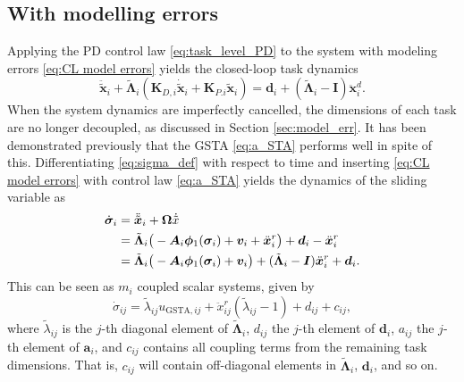 \documentclass[../main.tex]{subfiles}
\begin{document}
\subsection{With modelling errors}
\label{sec:analysis with model err}
Applying the PD control law \eqref{eq:task_level_PD} to the system with modeling errors \eqref{eq:CL model errors} yields the closed-loop task dynamics
\begin{equation}
    \label{eq:closed loop PD}
    \ddot{\tilde{\bm{x}}}_i
    +\tilde{\bm{\Lambda}}_i (
    \bm{K}_{D,i}\dot{\tilde{\bm{x}}}_i
    + \bm{K}_{P.i}\tilde{\bm{x}}_i)
    = \bm{d}_i + (\tilde{\bm{\Lambda}}_i - \bm{I})\ddot{\bm{x}}_i^d.
\end{equation}
When the system dynamics are imperfectly cancelled, the dimensions of each task are no longer decoupled, as discussed in Section \ref{sec:model_err}. It has been demonstrated previously \citep{Borlaug2022} that the GSTA \eqref{eq:a_STA} performs well in spite of this. Differentiating \eqref{eq:sigma_def} with respect to time and inserting \eqref{eq:CL model errors} with control law \eqref{eq:a_STA} yields the dynamics of the sliding variable as
\begin{align}
    \dot{\bm{\sigma}}_i &= \ddot{\tilde{\bm{x}}}_i + \bm{\Omega}\dot{\tilde{x}} \notag\\
    &= \tilde{\bm{\Lambda}}_i
    \big(-\bm{A}_{i} \bm{\phi}_1(\bm{\sigma}_i) + \bm{v}_i + \ddot{\bm{x}}^r_i \big)
    + \bm{d}_i - \ddot{\bm{x}}_i^r \notag \\
    &= \tilde{\bm{\Lambda}}_i
    \big(-\bm{A}_{i} \bm{\phi}_1(\bm{\sigma}_i) + \bm{v}_i \big)
    + (\tilde{\bm{\Lambda}}_i - \bm{I})\ddot{\bm{x}}_i^r + \bm{d}_i.
\end{align}
This can be seen as $m_i$ coupled scalar systems, given by
\begin{equation}
    \label{eq:sigma dynamics uncertain}
        \dot{\sigma}_{ij} = \tilde{\lambda}_{ij}u_{\mathrm{GSTA}, ij} + \ddot{x}_{ij}^r(\tilde{\lambda}_{ij} - 1) + d_{ij} + c_{ij},
\end{equation}
where $\tilde{\lambda}_{ij}$ is the $j$-th diagonal element of $\tilde{\bm{\Lambda}}_i$, $d_{ij}$ the $j$-th element of $\bm{d}_i$, $a_{ij}$ the $j$-th element of $\bm{a}_i$, and $c_{ij}$ contains all coupling terms from the remaining task dimensions. That is, $c_{ij}$ will contain off-diagonal elements in $\tilde{\bm{\Lambda}}_i$, $\bm{d}_i$, and so on.
\end{document}

